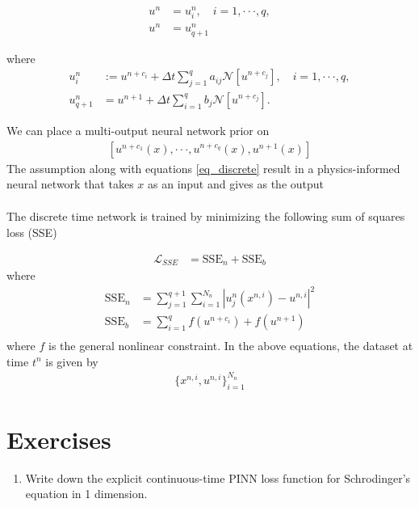 \documentclass[book.tex]{subfiles}
\begin{document}
\begin{align}
u^n &=u^n_i,\quad i=1,\cdot\cdot\cdot,q,\\
u^n &=u^n_{q+1}
\end{align}

where
\begin{align}
u_i^n&:=u^{n+c_i}+\Delta t\sum_{j=1}^{q}a_{ij}\mathcal{N}[u^{n+c_j}], \quad i=1,\cdot\cdot\cdot,q,\\
u^{n}_{q+1}&=u^{n+1}+\Delta t\sum_{i=1}^{q}b_{j}\mathcal{N}[u^{n+c_j}].
\end{align}

We can place a multi-output neural network prior on
\begin{align}
\label{eq_discrete}
    [u^{n+c_1}(x),\cdot\cdot\cdot,u^{n+c_q}(x),u^{n+1}(x)]
\end{align}
The assumption along with equations \ref{eq_discrete} result in a physics-informed neural network that takes $x$ as an input and gives as the output 
\begin{align}
    [u^{n}_1(x),\cdot\cdot\cdot,u^{n}_q(x),u_{q+1}^{n+1}(x)]
\end{align}

The discrete time network is trained by minimizing the following sum of squares loss (SSE)

\begin{align}
    \mathcal{L}_{SSE} &= \textrm{SSE}_n + \textrm{SSE}_b
\end{align}
where 
\begin{align}
    \textrm{SSE}_n &= \sum_{j=1}^{q+1} \sum_{i=1}^{N_n} |u^n_j(x^{n,i}) - u^{n,i}|^2 \\
    \textrm{SSE}_b &= \sum_{i=1}^q f(u^{n+c_i}) + f(u^{n+1}) \\
\end{align}
where $f$ is the general nonlinear constraint. In the above equations, the dataset at time $t^n$ is given by
\begin{align}
    \{x^{n,i}, u^{n,i}\}_{i=1}^{N_n}
\end{align}

\section{Exercises}
\begin{enumerate}
    \item Write down the explicit continuous-time PINN loss function for Schrodinger's equation in 1 dimension.
\end{enumerate}
\end{document}
